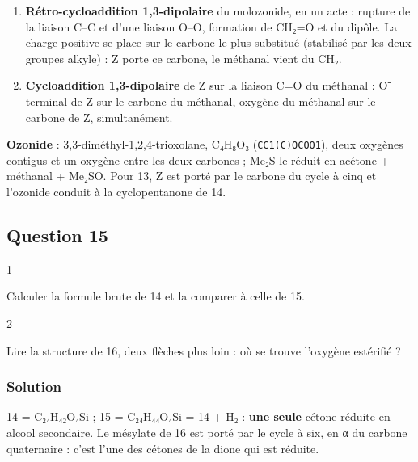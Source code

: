 \documentclass[11pt,a4paper]{article}
\providecommand{\tightlist}{\setlength{\itemsep}{0pt}\setlength{\parskip}{0pt}}
\begin{document}
\begin{enumerate}
\def\labelenumi{\arabic{enumi}.}
\tightlist
\item
  \textbf{Rétro-cycloaddition 1,3-dipolaire} du molozonide, en un acte : rupture de la liaison C--C et d'une liaison O--O, formation de CH₂=O et du dipôle. La charge positive se place sur le carbone le plus substitué (stabilisé par les deux groupes alkyle) : Z porte ce carbone, le méthanal vient du CH₂.
\item
  \textbf{Cycloaddition 1,3-dipolaire} de Z sur la liaison C=O du méthanal : O⁻ terminal de Z sur le carbone du méthanal, oxygène du méthanal sur le carbone de Z, simultanément.
\end{enumerate}

\textbf{Ozonide} : 3,3-\allowbreak{}diméthyl-\allowbreak{}1,2,4-\allowbreak{}trioxolane, C₄H₈O₃ (\texttt{CC1(C)OCOO1}), deux oxygènes contigus et un oxygène entre les deux carbones ; Me₂S le réduit en acétone + méthanal + Me₂SO. Pour 13, Z est porté par le carbone du cycle à cinq et l'ozonide conduit à la cyclopentanone de 14.

\hypertarget{question-15}{%
\subsection{Question 15}\label{question-15}}

\begin{indication}{1}

Calculer la formule brute de 14 et la comparer à celle de 15.

\end{indication}

\begin{indication}{2}

Lire la structure de 16, deux flèches plus loin : où se trouve l'oxygène estérifié ?

\end{indication}

\hypertarget{solution-14}{%
\subsubsection{Solution}\label{solution-14}}

14 = C₂₄H₄₂O₄Si ; 15 = C₂₄H₄₄O₄Si = 14 + H₂ : \textbf{une seule} cétone réduite en alcool secondaire. Le mésylate de 16 est porté par le cycle à six, en α du carbone quaternaire : c'est l'une des cétones de la dione qui est réduite.
\end{document}
